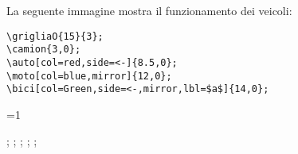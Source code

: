 \documentclass[italian, a4paper]{article}
\def\showimmagini{1} %
\def\showslowimmagini{\showimmagini} %
\begin{document}
La seguente immagine mostra il funzionamento dei veicoli:

\begin{Verbatim}[frame=single]
\grigliaO{15}{3};
\camion{3,0};
\auto[col=red,side=<-]{8.5,0};
\moto[col=blue,mirror]{12,0};
\bici[col=Green,side=<-,mirror,lbl=$a$]{14,0};
\end{Verbatim}
\vspace*{-4mm}

\ifnum\showslowimmagini=1
\begin{immagine}
;
;
;
;
;
\end{immagine}
\fi
\end{document}
